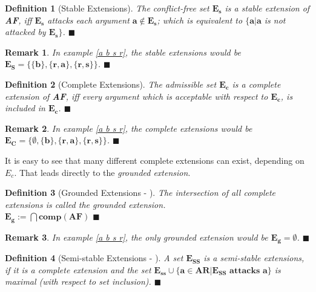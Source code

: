 \documentclass[12pt]{report}
\numberwithin{figure}{chapter}
\theoremstyle{break}
\newtheorem{defn}{Definition}[chapter]
\newtheorem*{rmrk}{Remark}
\newenvironment{mydefn}{\begin{defn}}{$\blacksquare$ \end{defn}}
\newenvironment{myrmrk}{\begin{rmrk}}{$\blacksquare$ \end{rmrk}}
\begin{document}
\begin{mydefn}[Stable Extensions]
The conflict-free set $\bm{E_{s}}$ is a stable extension of \textbf{AF}, iff $\bm{E_{s}}$ attacks each argument $\bm{a \notin E_{s}}$; which is equivalent to
$\bm{\{a \vert a}$ is not attacked by $\bm{E_{s}\}}$.
\end{mydefn}

\begin{myrmrk}
In example \ref{a b s r}, the stable extensions would be $\bm{E_{S} = \{\{b\},\{r,a\},\{r,s\}\}}$.
\end{myrmrk}

\newpage

\begin{mydefn}[Complete Extensions]
The admissible set $\bm{E_{c}}$ is a complete extension of \textbf{AF}, iff every argument which is acceptable with respect to $\bm{E_{c}}$, is included in $\bm{E_{c}}$.
\end{mydefn}

\begin{myrmrk}
In example \ref{a b s r}, the complete extensions would be $\bm{E_{C} = \{\emptyset,\{b\},\{r,a\},\{r,s\}\}}$.
\end{myrmrk}

It is easy to see that many different complete extensions can exist, depending on $E_{c}$. That leads directly to the \textit{grounded extension}.

\begin{mydefn}[Grounded Extensions - \cite{Egly}]
The intersection of all complete extensions is called the grounded extension.\\ $\bm{E_{g} := \bigcap{comp(AF)}}$
\label{ground ext}
\end{mydefn}

\begin{myrmrk}
In example \ref{a b s r}, the only grounded extension would be $\bm{E_{g} = \emptyset}$.
\end{myrmrk}

\begin{mydefn}[Semi-stable Extensions - \cite{Caminada}]
A set $\bm{E_{SS}}$ is a semi-stable extensions, if it is a complete extension and the set $\bm{E_{ss} \cup \{a \in AR \vert E_{SS} \text{ attacks }a\}}$
is maximal (with respect to set inclusion).
\label{semi ext}
\end{mydefn}
\end{document}
